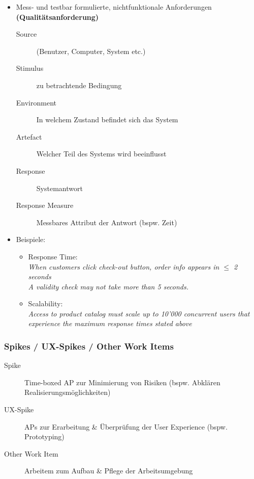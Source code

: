 \documentclass[a4paper]{article}
\begin{document}
			\begin{itemize}
				\item Mess- und testbar formulierte, nichtfunktionale Anforderungen \textbf{(Qualitätsanforderung)}
					\begin{description}
						\item[Source] (Benutzer, Computer, System etc.)
						\item[Stimulus] zu betrachtende Bedingung
						\item[Environment] In welchem Zustand befindet sich das System
						\item[Artefact] Welcher Teil des Systems wird beeinflusst
						\item[Response] Systemantwort
						\item[Response Measure] Messbares Attribut der Antwort (bspw. Zeit)
					\end{description}
				\item Beispiele:
					\begin{itemize}
						\item Response Time:\\
							\textit{When customers click check-out button, order info appears in $\leq$ 2 seconds}\\
							\textit{A validity check may not take more than 5 seconds.}
						\item Scalability:\\
							\textit{Access to product catalog must scale up to 10'000 concurrent users that experience the maximum response times stated above}
					\end{itemize}
			\end{itemize}
	
\newpage
		
			\subsubsection{Spikes / UX-Spikes / Other Work Items}
			
			\begin{description}
				\item[Spike] Time-boxed AP zur Minimierung von Risiken (bspw. Abklären Realisierungsmöglichkeiten)
				\item[UX-Spike] APs zur Erarbeitung \& Überprüfung der User Experience (bspw. Prototyping)
				\item[Other Work Item] Arbeitem zum Aufbau \& Pflege der Arbeitsumgebung
			\end{description}
		
\end{document}
